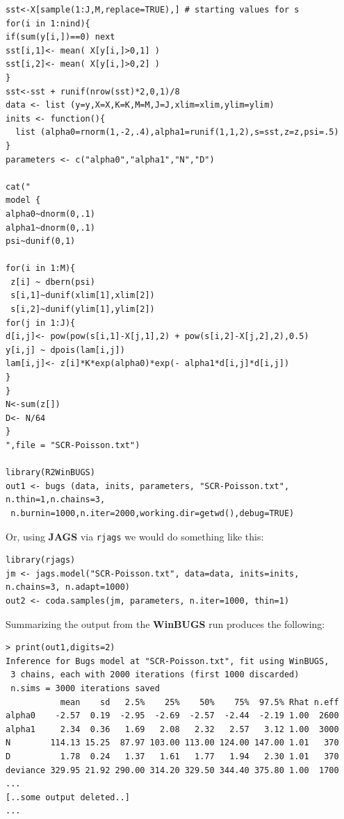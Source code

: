 {\small
\begin{verbatim}
sst<-X[sample(1:J,M,replace=TRUE),] # starting values for s
for(i in 1:nind){
if(sum(y[i,])==0) next
sst[i,1]<- mean( X[y[i,]>0,1] )
sst[i,2]<- mean( X[y[i,]>0,2] )
}
sst<-sst + runif(nrow(sst)*2,0,1)/8
data <- list (y=y,X=X,K=K,M=M,J=J,xlim=xlim,ylim=ylim)
inits <- function(){
  list (alpha0=rnorm(1,-2,.4),alpha1=runif(1,1,2),s=sst,z=z,psi=.5)
}
parameters <- c("alpha0","alpha1","N","D")

cat("
model {
alpha0~dnorm(0,.1)
alpha1~dnorm(0,.1)
psi~dunif(0,1)

for(i in 1:M){
 z[i] ~ dbern(psi)
 s[i,1]~dunif(xlim[1],xlim[2])
 s[i,2]~dunif(ylim[1],ylim[2])
for(j in 1:J){
d[i,j]<- pow(pow(s[i,1]-X[j,1],2) + pow(s[i,2]-X[j,2],2),0.5)
y[i,j] ~ dpois(lam[i,j])
lam[i,j]<- z[i]*K*exp(alpha0)*exp(- alpha1*d[i,j]*d[i,j])
}
}
N<-sum(z[])
D<- N/64
}
",file = "SCR-Poisson.txt")

library(R2WinBUGS)
out1 <- bugs (data, inits, parameters, "SCR-Poisson.txt", n.thin=1,n.chains=3,
 n.burnin=1000,n.iter=2000,working.dir=getwd(),debug=TRUE)
\end{verbatim}
}
{\flushleft Or, using {\bf JAGS} via \mbox{\tt rjags} we would do
  something like this:}
{\small
\begin{verbatim}
library(rjags)
jm <- jags.model("SCR-Poisson.txt", data=data, inits=inits, n.chains=3, n.adapt=1000)
out2 <- coda.samples(jm, parameters, n.iter=1000, thin=1)
\end{verbatim}
}
{\flushleft
Summarizing } the output from the {\bf WinBUGS}  run produces the following:
{\small
\begin{verbatim}
> print(out1,digits=2)
Inference for Bugs model at "SCR-Poisson.txt", fit using WinBUGS,
 3 chains, each with 2000 iterations (first 1000 discarded)
 n.sims = 3000 iterations saved
           mean    sd   2.5%    25%    50%    75%  97.5% Rhat n.eff
alpha0    -2.57  0.19  -2.95  -2.69  -2.57  -2.44  -2.19 1.00  2600
alpha1     2.34  0.36   1.69   2.08   2.32   2.57   3.12 1.00  3000
N        114.13 15.25  87.97 103.00 113.00 124.00 147.00 1.01   370
D          1.78  0.24   1.37   1.61   1.77   1.94   2.30 1.01   370
deviance 329.95 21.92 290.00 314.20 329.50 344.40 375.80 1.00  1700
...
[..some output deleted..]
...
\end{verbatim}
}



